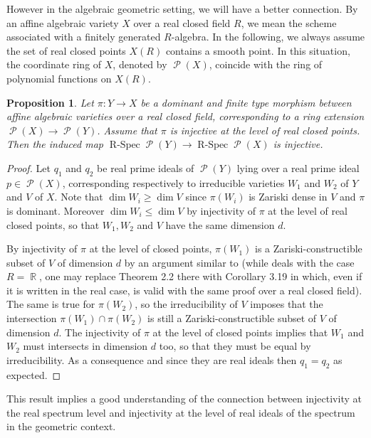 \documentclass[12pt]{amsart}
\newtheorem{prop}[thm]{Proposition}
\theoremstyle{definition}
\DeclareMathOperator{\R}{\mathbb R}
\DeclareMathOperator{\Pol}{\mathcal P}
\DeclareMathOperator{\RSp}{R-Spec}
\begin{document}
However in the algebraic geometric setting, we will have a better connection. By an affine algebraic variety $X$ over a real closed field $R$, we mean the scheme associated with a finitely generated $R$-algebra. In the following, we always assume the set of real closed points $X(R)$ contains a smooth point. In this situation, the coordinate ring of $X$, denoted by $\Pol(X)$, coincide with the ring of polynomial functions on $X(R)$. 





\begin{prop}\label{prop-inj}
Let $\pi : Y\to X$ be a dominant and finite type morphism between affine algebraic varieties over a real closed field, corresponding to a ring extension $\Pol(X)\to \Pol(Y)$. Assume that $\pi$ is injective at the level of real closed points. Then the induced map $\RSp \Pol(Y) \to \RSp \Pol(X)$ is injective.
\end{prop}


\begin{proof}
Let $q_1$ and $q_2$ be real prime ideals of $\Pol(Y)$ lying over a real prime ideal $p\in \Pol(X)$, corresponding respectively to irreducible varieties $W_1$ and $W_2$ of $Y$ and $V$ of $X$. Note that $\dim W_i \geq \dim V$ since $\pi(W_i)$ is Zariski dense in $V$ and $\pi$ is dominant. Moreover $\dim W_i\leq \dim V$ by injectivity of $\pi$ at the level of real closed points, so that  $W_1, W_2$ and $V$ have the same dimension $d$.

By injectivity of $\pi$ at the level of closed points, $\pi(W_1)$ is a Zariski-constructible subset of $V$ of dimension $d$ by an argument similar to \cite{P} (while \cite{P} deals with the case $R=\R$, one may replace Theorem 2.2 there with Corollary 3.19 in \cite{Cos} which, even if it is written in the real case, is valid with the same proof over a real closed field). 
The same is true for $\pi(W_2)$, so the irreducibility of $V$ imposes that the intersection $\pi(W_1) \cap \pi(W_2)$ is still a Zariski-constructible subset of $V$ of dimension $d$. The injectivity of $\pi$ at the level of closed points implies that $W_1$ and $W_2$ must intersects in dimension $d$ too, so that they must be equal by irreducibility. As a consequence and since they are real ideals then $q_1=q_2$ as expected.
\end{proof}


This result implies a good understanding of the connection between injectivity at the real spectrum level and injectivity at the level of real ideals of the spectrum in the geometric context.
\end{document}
